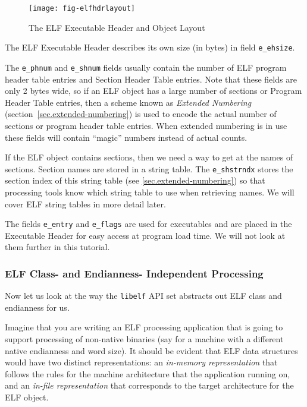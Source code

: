 \documentclass[a4paper]{book}
\makeatletter
\newcommand{\firstterm}[1]{\textit{#1}}                 %
\newcommand{\library}[1]{\texttt{#1}}
\newcommand{\parameter}[1]{\texttt{#1}}
\newenvironment{callout}[2][blue]{%
  \begingroup\newcommand{\@cocolor}{#1}%
  \newcommand{\@cogroup}[1]{#2}}{\endgroup}
\newcommand{\@co}[1]{\framebox{\textbf{\color{\@cocolor}#1}}}
\newcommand{\coref}[1]{%
  \hypertarget{\@cogroup.#1.cr}{%
    \hyperlink{\@cogroup.#1.co}{\@co{#1}}}}
\makeatother
\begin{document}
\begin{callout}{ehdr}
\begin{description}
    \begin{figure}[H]
      \caption{The ELF Executable Header and Object Layout}
      \label{fig.elf.ehdr-layout}
      \begin{center}
        \texttt{[image: fig-elfhdrlayout]}
      \end{center}
    \end{figure}

    The ELF Executable Header describes its own size (in bytes) in
    field \parameter{e\_ehsize}.

    \item[\coref{6} \coref{7}] The \parameter{e\_phnum} and
      \parameter{e\_shnum} fields usually contain the number of ELF
      program header table entries and Section Header Table entries.
      Note that these fields are only 2 bytes wide, so if an ELF
      object has a large number of sections or Program Header Table
      entries, then a scheme known as \firstterm{Extended Numbering}
      (section~\vref{sec.extended-numbering}) is used to encode the
      actual number of sections or program header table entries.  When
      extended numbering is in use these fields will contain ``magic''
      numbers instead of actual counts.

    \item[\coref{8}] If the ELF object contains sections, then we need
      a way to get at the names of sections.  Section names are stored
      in a string table. The \parameter{e\_shstrndx} stores the
      section index of this string table (see
      \vref{sec.extended-numbering}) so that processing tools know
      which string table to use when retrieving names.  We will cover
      ELF string tables in more detail later.
  \end{description}

  The fields \parameter{e\_entry} and \parameter{e\_flags} are used
  for executables and are placed in the Executable Header for easy
  access at program load time.  We will not look at them further in
  this tutorial.
\end{callout}

\subsubsection{ELF Class- and Endianness- Independent Processing}
Now let us look at the way the \library{libelf} API set abstracts out
ELF class and endianness for us.

Imagine that you are writing an ELF processing application that is
going to support processing of non-native binaries (say for a machine
with a different native endianness and word size).  It should be
evident that ELF data structures would have two distinct
representations: an \firstterm{in-memory representation} that follows
the rules for the machine architecture that the application running
on, and an \firstterm{in-file representation} that corresponds to the
target architecture for the ELF object.
\end{document}

